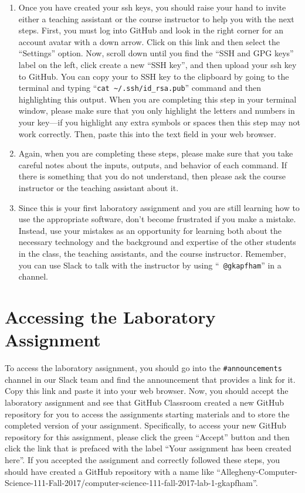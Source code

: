 \documentclass[11pt]{article}
\begin{document}
\begin{enumerate}
  \item Once you have created your ssh keys, you should raise your hand to invite either a teaching assistant or the
    course instructor to help you with the next steps. First, you must log into GitHub and look in the right corner for
    an account avatar with a down arrow. Click on this link and then select the ``Settings'' option. Now, scroll down
    until you find the ``SSH and GPG keys'' label on the left, click create a new ``SSH key'', and then upload your ssh
    key to GitHub. You can copy your to SSH key to the clipboard by going to the terminal and typing ``{\tt cat
    \textasciitilde{}/.ssh/id\_rsa.pub}'' command and then highlighting this output. When you are completing this step
    in your terminal window, please make sure that you only highlight the letters and numbers in your key---if you
    highlight any extra symbols or spaces then this step may not work correctly. Then, paste this into the text field in
    your web browser.

  \item Again, when you are completing these steps, please make sure that you take careful notes about the inputs,
    outputs, and behavior of each command. If there is something that you do not understand, then please ask the course
    instructor or the teaching assistant about it.

  \item Since this is your first laboratory assignment and you are still learning how to use the appropriate software,
    don't become frustrated if you make a mistake. Instead, use your mistakes as an opportunity for learning both about
    the necessary technology and the background and expertise of the other students in the class, the teaching
    assistants, and the course instructor. Remember, you can use Slack to talk with the instructor by using ``{\tt
    @gkapfham}'' in a channel.

\end{enumerate}

\section*{Accessing the Laboratory Assignment}

To access the laboratory assignment, you should go into the {\tt \#announcements} channel in our Slack team and find the
announcement that provides a link for it. Copy this link and paste it into your web browser. Now, you should accept the
laboratory assignment and see that GitHub Classroom created a new GitHub repository for you to access the assignments
starting materials and to store the completed version of your assignment. Specifically, to access your new GitHub
repository for this assignment, please click the green ``Accept'' button and then click the link that is prefaced with
the label ``Your assignment has been created here''. If you accepted the assignment and correctly followed these steps,
you should have created a GitHub repository with a name like
``Allegheny-Computer-Science-111-Fall-2017/computer-science-111-fall-2017-lab-1-gkapfham''.
\end{document}

